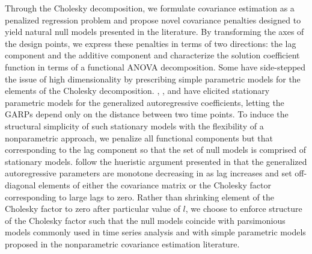 %
%


Through the Cholesky decomposition, we formulate covariance estimation as a penalized regression problem and propose novel covariance penalties designed to yield natural null models presented in the literature. By transforming the axes of the design points, we express these penalties in terms of two directions: the lag component and the additive component and characterize the solution coefficient function in terms of a functional ANOVA decomposition. Some have side-stepped the issue of high dimensionality by prescribing simple parametric models for the elements of the Cholesky decomposition.  \cite{chen2011semiparametric}, \cite{pourahmadi1999joint}, and \cite{pourahmadi2002dynamic} have elicited stationary parametric models for the generalized autoregressive coefficients, letting the GARPs depend only on the distance between two time points. To induce the structural simplicity of such stationary models with the flexibility of a nonparametric approach, we penalize all functional components but that corresponding to the lag component so that the set of null models is comprised of stationary models.  \cite{huang2007estimation} follow the hueristic argument presented in \cite{pourahmadi1999joint} that the generalized autoregressive parameters are monotone decreasing in as lag increases and set off-diagonal elements of either the covariance matrix or the Cholesky factor corresponding to large lags to zero. Rather than shrinking element of the Cholesky factor to zero after particular value of $l$, we choose to enforce structure of the Cholesky factor such that the null models coincide with parsimonious models commonly used in time series analysis and with simple parametric models proposed in the nonparametric covariance estimation literature.


